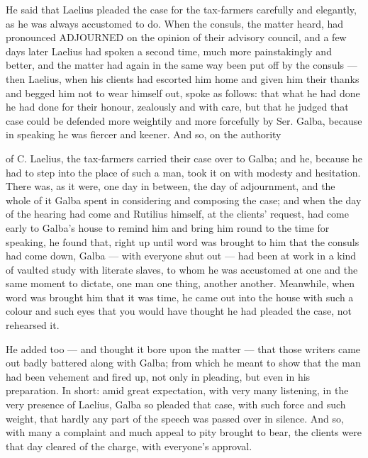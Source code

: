  He said that Laelius pleaded the case for the tax-farmers carefully and elegantly, as he was always accustomed to do. When the consuls, the matter heard, had pronounced ADJOURNED on the opinion of their advisory council, and a few days later Laelius had spoken a second time, much more painstakingly and better, and the matter had again in the same way been put off by the consuls — then Laelius, when his clients had escorted him home and given him their thanks and begged him not to wear himself out, spoke as follows: that what he had done he had done for their honour, zealously and with care, but that he judged that case could be defended more weightily and more forcefully by Ser. Galba, because in speaking he was fiercer and keener. And so, on the authority

 of C. Laelius, the tax-farmers carried their case over to Galba; and he, because he had to step into the place of such a man, took it on with modesty and hesitation. There was, as it were, one day in between, the day of adjournment, and the whole of it Galba spent in considering and composing the case; and when the day of the hearing had come and Rutilius himself, at the clients' request, had come early to Galba's house to remind him and bring him round to the time for speaking, he found that, right up until word was brought to him that the consuls had come down, Galba — with everyone shut out — had been at work in a kind of vaulted study with literate slaves, to whom he was accustomed at one and the same moment to dictate, one man one thing, another another. Meanwhile, when word was brought him that it was time, he came out into the house with such a colour and such eyes that you would have thought he had pleaded the case, not rehearsed it.

 He added too — and thought it bore upon the matter — that those writers came out badly battered along with Galba; from which he meant to show that the man had been vehement and fired up, not only in pleading, but even in his preparation. In short: amid great expectation, with very many listening, in the very presence of Laelius, Galba so pleaded that case, with such force and such weight, that hardly any part of the speech was passed over in silence. And so, with many a complaint and much appeal to pity brought to bear, the clients were that day cleared of the charge, with everyone's approval.

